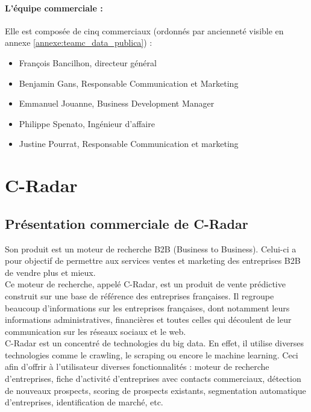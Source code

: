         \paragraph{L'équipe commerciale :}
            Elle est composée de cinq commerciaux (ordonnés par ancienneté visible en annexe \ref{annexe:teamc_data_publica}) :
            \begin{itemize}
                \item François Bancilhon, directeur général
                \item Benjamin Gans, Responsable Communication et Marketing
                \item Emmanuel Jouanne, Business Development Manager
                \item Philippe Spenato, Ingénieur d'affaire
                \item Justine Pourrat, Responsable Communication et marketing
            \end{itemize}

\section{C-Radar}\label{c_radar}
    \subsection{Présentation commerciale de C-Radar}
        Son produit est un moteur de recherche B2B (Business to Business). Celui-ci a pour objectif de permettre aux services ventes et marketing des entreprises B2B de vendre plus et mieux.\\
        Ce moteur de recherche, appelé C-Radar, est un produit de vente prédictive construit sur une base de référence des entreprises françaises. Il regroupe beaucoup d'informations sur les entreprises françaises, dont notamment leurs informations administratives, financières et toutes celles qui découlent de leur communication sur les réseaux sociaux et le web.\\

        C-Radar est un concentré de technologies du big data. En effet, il utilise diverses technologies comme le crawling, le scraping ou encore le machine learning. Ceci afin d'offrir à l'utilisateur diverses fonctionnalités : moteur de recherche d'entreprises, fiche d'activité d'entreprises avec contacts commerciaux, détection de nouveaux prospects, scoring de prospects existants, segmentation automatique d'entreprises, identification de marché, etc.

